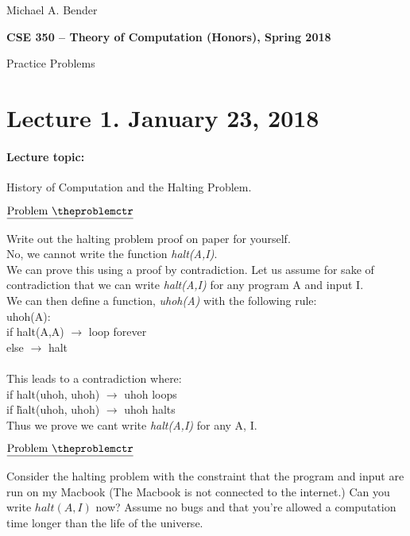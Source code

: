 \documentclass[11pt]{article}
\def\pp{\par\noindent}
\begin{document}
\begin{flushright}

         Michael A. Bender
\end{flushright}
\centerline{\bf CSE 350 -- Theory of Computation (Honors), Spring 2018}
\medskip
\centerline{Practice Problems}


\newcommand{\lecturedate}[1]{\section*{#1}}

\lecturedate{Lecture 1.  January 23, 2018}



\paragraph{Lecture topic: }  History of Computation and the Halting Problem.

\addtocounter{problemctr}{1}
\bigskip
\noindent
$\underline{\rm Problem\ \theproblemctr}$\pp

\noindent
Write out the halting problem proof on paper for yourself.\\

No, we cannot write the function \textit{halt(A,I)}.\\
We can prove this using a proof by contradiction. Let us assume for sake of contradiction that we can write \textit{halt(A,I)} for any program A and input I.\\
We can then define a function, \textit{uhoh(A)} with the following rule:\\

\noindent
uhoh(A):\\
\indent if halt(A,A) $\rightarrow$ loop forever\\
\indent else $\rightarrow$ halt\\\\
This leads to a contradiction where:\\
if halt(uhoh, uhoh) $\rightarrow$ uhoh loops\\
if \~halt(uhoh, uhoh) $\rightarrow$ uhoh halts\\
Thus we prove we cant write \textit{halt(A,I)} for any A, I.

\addtocounter{problemctr}{1}
\bigskip
\noindent
$\underline{\rm Problem\ \theproblemctr}$\pp

\noindent
Consider the halting problem with the constraint that the program and input are run on my Macbook (The Macbook is not connected to the internet.) Can you write $halt(A, I)$ now? Assume no bugs and that you're allowed a computation time longer than the life of the universe.
\end{document}
